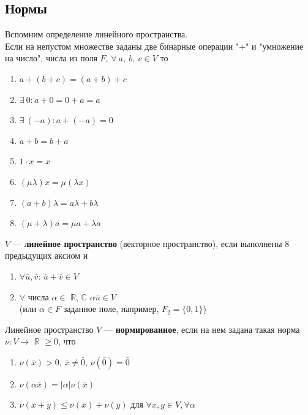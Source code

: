 \subsection{Нормы}
Вспомним определение линейного пространства.\\
Если на непустом множестве заданы две бинарные операции "+" и "умножение на число", числа из поля $F$, $\forall ~a,~b,~c\in V$ то\begin{enumerate}
    \item $a+(b+c) = (a+b)+c$
    \item $\exists~0: a+0 = 0+a = a$
    \item $\exists~ (-a): a+(-a) = 0$
    \item $a+b = b+a$
    \item $1\cdot x = x$
    \item $ (\mu \lambda)x = \mu(\lambda x)$
    \item $(a+b)\lambda = a\lambda + b\lambda$
    \item $(\mu + \lambda)a = \mu a + \lambda a$
\end{enumerate}
\begin{definition}
$V$ --- \textbf{линейное пространство} (векторное пространство), если выполнены 8 предыдущих аксиом и \begin{enumerate}
    \item $\forall \bar u, \bar v$: $\bar u + \bar v \in V$
    \item $\forall$ числа $\alpha \in$ $\mathbb{R}$, $\mathbb{C}$ $\alpha \bar u \in V$\\ 
    (или $\alpha \in F$ заданное поле, например, $F_2 = \{ 0, 1 \}$)\end{enumerate}
\end{definition}
\begin{definition}
Линейное пространство $V$ --- \textbf{нормированное}, если на нем задана такая норма \\$\nu : V \to$ $\mathbb{R}$ $\geqslant 0$, что\begin{enumerate}
    \item $\nu(\bar x) > 0$, $\bar x \neq \bar 0$, $\nu(\bar 0) = \bar 0$
    \item $\nu(\alpha \bar x) = |\alpha|\nu(\bar x)$
    \item $\nu(\bar x + \bar y) \leq \nu(\bar x) + \nu(\bar y)$ для $\forall x, y \in V, \forall \alpha$
\end{enumerate}
\end{definition}

